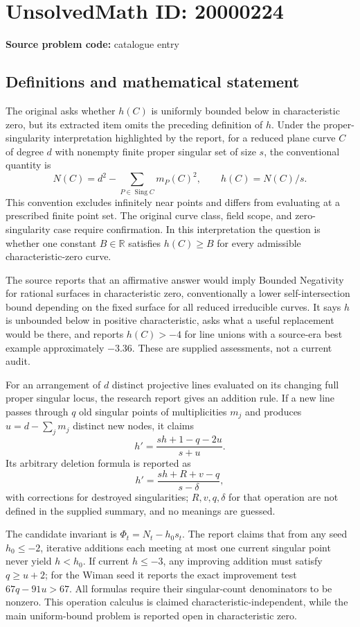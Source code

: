 \documentclass[11pt]{article}
\newcommand{\R}{\mathbb{R}}
\begin{document}
\section*{UnsolvedMath ID: 20000224}
\textbf{Source problem code:} catalogue entry
\subsection{Definitions and mathematical statement}
The original asks whether $h(C)$ is uniformly bounded below in characteristic zero, but its extracted item omits the preceding definition of $h$. Under the proper-singularity interpretation highlighted by the report, for a reduced plane curve $C$ of degree $d$ with nonempty finite proper singular set of size $s$, the conventional quantity is
\[
 N(C)=d^2-\sum_{P\in\operatorname{Sing}C}m_P(C)^2,
 \qquad h(C)=N(C)/s.
\]
This convention excludes infinitely near points and differs from evaluating at a prescribed finite point set. The original curve class, field scope, and zero-singularity case require confirmation. In this interpretation the question is whether one constant $B\in\R$ satisfies $h(C)\geq B$ for every admissible characteristic-zero curve.

The source reports that an affirmative answer would imply Bounded Negativity for rational surfaces in characteristic zero, conventionally a lower self-intersection bound depending on the fixed surface for all reduced irreducible curves. It says $h$ is unbounded below in positive characteristic, asks what a useful replacement would be there, and reports $h(C)>-4$ for line unions with a source-era best example approximately $-3.36$. These are supplied assessments, not a current audit.

For an arrangement of $d$ distinct projective lines evaluated on its changing full proper singular locus, the research report gives an addition rule. If a new line passes through $q$ old singular points of multiplicities $m_j$ and produces $u=d-\sum_jm_j$ distinct new nodes, it claims
\[
 h'=\frac{s h+1-q-2u}{s+u}.
\]
Its arbitrary deletion formula is reported as
\[
 h'=\frac{s h+R+v-q}{s-\delta},
\]
with corrections for destroyed singularities; $R,v,q,\delta$ for that operation are not defined in the supplied summary, and no meanings are guessed.

The candidate invariant is $\Phi_t=N_t-h_0s_t$. The report claims that from any seed $h_0\leq-2$, iterative additions each meeting at most one current singular point never yield $h<h_0$. If current $h\leq-3$, any improving addition must satisfy $q\geq u+2$; for the Wiman seed it reports the exact improvement test $67q-91u>67$. All formulas require their singular-count denominators to be nonzero. This operation calculus is claimed characteristic-independent, while the main uniform-bound problem is reported open in characteristic zero.
\end{document}
